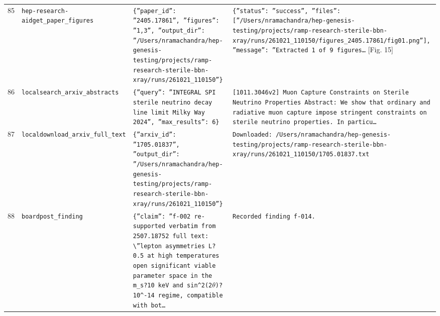 \documentclass[11pt,a4paper]{article}
\begin{document}
\begin{longtable}{@{}p{}p{}p{}p{}@{}}
85 & \texttt{hep-research-aid}\newline\texttt{get\_\allowbreak{}paper\_\allowbreak{}figures} & \texttt{\{''paper\_\allowbreak{}id'':\allowbreak{} ''2405.17861'',\allowbreak{} ''figures'':\allowbreak{} ''1,\allowbreak{}3'',\allowbreak{} ''output\_\allowbreak{}dir'':\allowbreak{} ''/\allowbreak{}Users/\allowbreak{}nramachandra/\allowbreak{}hep-genesis-testing/\allowbreak{}projects/\allowbreak{}ramp-research-sterile-bbn-xray/\allowbreak{}runs/\allowbreak{}261021\_\allowbreak{}110150''\}\allowbreak{}} & \texttt{\{''status'':\allowbreak{} ''success'',\allowbreak{} ''files'':\allowbreak{} [''/\allowbreak{}Users/\allowbreak{}nramachandra/\allowbreak{}hep-genesis-testing/\allowbreak{}projects/\allowbreak{}ramp-research-sterile-bbn-xray/\allowbreak{}runs/\allowbreak{}261021\_\allowbreak{}110150/\allowbreak{}figures\_\allowbreak{}2405.17861/\allowbreak{}fig01.png'']\allowbreak{},\allowbreak{} ''message'':\allowbreak{} ''Extracted 1 of 9 figures\ldots{}\allowbreak{}} [Fig. 15] \\
86 & \texttt{local}\newline\texttt{search\_\allowbreak{}arxiv\_\allowbreak{}abstracts} & \texttt{\{''query'':\allowbreak{} ''INTEGRAL SPI sterile neutrino decay line limit Milky Way 2024'',\allowbreak{} ''max\_\allowbreak{}results'':\allowbreak{} 6\}\allowbreak{}} & \texttt{[1011.3046v2]\allowbreak{} Muon Capture Constraints on Sterile Neutrino Properties Abstract:\allowbreak{} We show that ordinary and radiative muon capture impose stringent constraints on sterile neutrino properties. In particu\ldots{}\allowbreak{}} \\
87 & \texttt{local}\newline\texttt{download\_\allowbreak{}arxiv\_\allowbreak{}full\_\allowbreak{}text} & \texttt{\{''arxiv\_\allowbreak{}id'':\allowbreak{} ''1705.01837'',\allowbreak{} ''output\_\allowbreak{}dir'':\allowbreak{} ''/\allowbreak{}Users/\allowbreak{}nramachandra/\allowbreak{}hep-genesis-testing/\allowbreak{}projects/\allowbreak{}ramp-research-sterile-bbn-xray/\allowbreak{}runs/\allowbreak{}261021\_\allowbreak{}110150''\}\allowbreak{}} & \texttt{Downloaded:\allowbreak{} /\allowbreak{}Users/\allowbreak{}nramachandra/\allowbreak{}hep-genesis-testing/\allowbreak{}projects/\allowbreak{}ramp-research-sterile-bbn-xray/\allowbreak{}runs/\allowbreak{}261021\_\allowbreak{}110150/\allowbreak{}1705.01837.txt} \\
88 & \texttt{board}\newline\texttt{post\_\allowbreak{}finding} & \texttt{\{''claim'':\allowbreak{} ''f-002 re-supported verbatim from 2507.18752 full text:\allowbreak{} \textbackslash{}\allowbreak{}''lepton asymmetries L?0.5 at high temperatures open significant viable parameter space in the m\_\allowbreak{}s?10 keV and sin\textasciicircum{}\allowbreak{}2(2$\theta$)\allowbreak{}?10\textasciicircum{}\allowbreak{}-14 regime,\allowbreak{} compatible with bot\ldots{}\allowbreak{}} & \texttt{Recorded finding f-014.} \\

\end{longtable}
\end{document}
